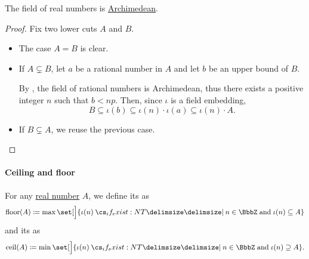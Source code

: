 \begin{proposition}\label{thm:real_numbers_archimedean}
  The field of real numbers is \hyperref[def:archimedean_field]{Archimedean}.
\end{proposition}
\begin{proof}
  Fix two lower cuts \( A \) and \( B \).

  \begin{itemize}
    \item The case \( A = B \) is clear.

    \item If \( A \subsetneq B \), let \( a \) be a rational number in \( A \) and let \( b \) be an upper bound of \( B \).

    By , the field of rational numbers is Archimedean, thus there exists a positive integer \( n \) such that \( b < np \). Then, since \( \iota \) is a field embedding,
    \begin{equation*}
      B \subseteq \iota(b) \subseteq \iota(n) \cdot \iota(a) \subseteq \iota(n) \cdot A.
    \end{equation*}

    \item If \( B \subsetneq A \), we reuse the previous case.
  \end{itemize}
\end{proof}

\paragraph{Ceiling and floor}

\begin{definition}\label{def:real_floor_ceiling}\mimprovised
  For any \hyperref[def:real_numbers]{real number} \( A \), we define its  as
  \begin{equation*}
    \floor(A) \coloneqq \max\set[\Big]{ \iota(n) \given* n \in \BbbZ \T{and} \iota(n) \subseteq A }
  \end{equation*}
  and its  as
  \begin{equation*}
    \ceil(A) \coloneqq \min\set[\Big]{ \iota(n) \given* n \in \BbbZ \T{and} \iota(n) \supseteq A }.
  \end{equation*}
\end{definition}

